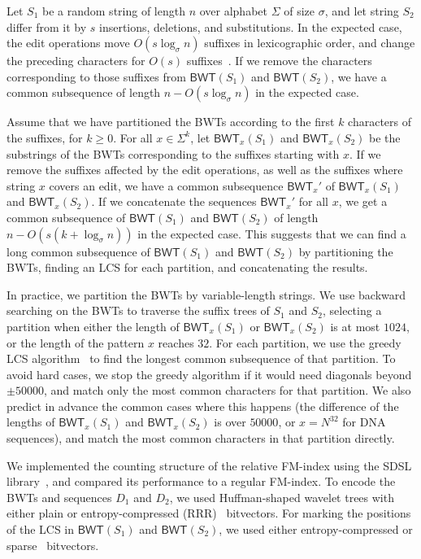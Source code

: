 \documentclass{llncs}
\newcommand{\BWT}
  {\ensuremath{\mathsf{BWT}}}
\begin{document}
Let $S_{1}$ be a random string of length $n$ over alphabet $\Sigma$ of size
$\sigma$, and let string $S_{2}$ differ from it by $s$ insertions, deletions,
and substitutions. In the expected case, the edit operations move $O(s
\log_{\sigma} n)$ suffixes in lexicographic order, and change the preceding
characters for $O(s)$ suffixes~\cite{MNSV10}. If we remove the characters
corresponding to those suffixes from $\BWT(S_{1})$ and $\BWT(S_{2})$, we have
a common subsequence of length $n - O(s \log_{\sigma} n)$ in the expected
case.

Assume that we have partitioned the BWTs according to the first $k$
characters of the suffixes, for $k \ge 0$. For all $x \in \Sigma^{k}$, let
$\BWT_{x}(S_{1})$ and $\BWT_{x}(S_{2})$ be the substrings of the BWTs
corresponding to the suffixes starting with $x$. If we remove the suffixes
affected by the edit operations, as well as the suffixes where string $x$
covers an edit, we have a common subsequence $\BWT_{x}'$ of $\BWT_{x}(S_{1})$
and $\BWT_{x}(S_{2})$. If we concatenate the sequences $\BWT_{x}'$ for all
$x$, we get a common subsequence of $\BWT(S_{1})$ and $\BWT(S_{2})$ of length
$n - O(s (k + \log_{\sigma} n))$ in the expected case. This suggests that we
can find a long common subsequence of $\BWT(S_{1})$ and $\BWT(S_{2})$ by
partitioning the BWTs, finding an LCS for each partition, and concatenating the
results.

In practice, we partition the BWTs by variable-length strings. We use
backward searching on the BWTs to traverse the suffix trees of $S_{1}$ and
$S_{2}$, selecting a partition when either the length of $\BWT_{x}(S_{1})$ or
$\BWT_{x}(S_{2})$ is at most $1024$, or the length of the pattern $x$ reaches
$32$. For each partition, we use the greedy LCS algorithm~\cite{Myers86} to
find the longest common subsequence of that partition. To avoid hard cases,
we stop the greedy algorithm if it would need diagonals beyond $\pm 50000$,
and match only the most common characters for that partition. We also predict
in advance the common cases where this happens (the difference of the lengths
of $\BWT_{x}(S_{1})$ and $\BWT_{x}(S_{2})$ is over $50000$, or $x = N^{32}$
for DNA sequences), and match the most common characters in that partition
directly.

We implemented the counting structure of the relative FM-index using the SDSL
library~\cite{Gog2014b}, and compared its performance to a regular FM-index.
To encode the BWTs and sequences $D_{1}$ and $D_{2}$, we used Huffman-shaped
wavelet trees with either plain or entropy-compressed (RRR)~\cite{Raman2007}
bitvectors. For marking the positions of the LCS in $\BWT(S_{1})$ and $\BWT(S_{2})$, we used either entropy-compressed or sparse~\cite{Okanohara2007} bitvectors.
\end{document}
